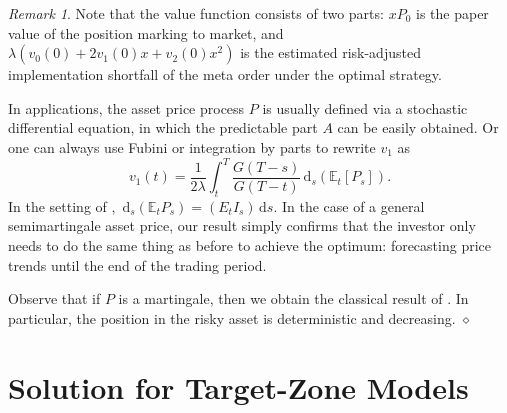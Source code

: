 \documentclass[11pt]{article}
\theoremstyle{definition}
\theoremstyle{remark}
\newtheorem{rem}[thm]{Remark}
\newcommand{\E}{\mathbb{E}} %
\newcommand{\close}{\hspace*{\fill}$\diamond$}
\newcommand{\de}{\,\mathrm{d}}
\begin{document}
\begin{rem}
Note that the value function consists of two parts: $xP_0$ is the paper value of the position marking to market, and $\lambda(v_0(0)+2v_1(0)x+v_2(0)x^2)$ is the estimated risk-adjusted implementation shortfall of the meta order under the optimal strategy.

In applications, the asset price process $P$ is usually defined via a stochastic differential equation, in which the predictable part $A$ can be easily obtained. Or one can always use Fubini or integration by parts to rewrite $v_1$ as $$v_1(t)= \frac{1}{2\lambda}\int_t^T \frac{G(T-s)}{G(T-t)} \de_s\left(\E_t[P_s]\right).$$
In the setting of \cite{lehalle2017incorporating}, $\de_s(\E_t P_s) = (E_t I_s)\de s$. In the case of a general semimartingale asset price, our result simply confirms that the investor only needs to do the same thing as before to achieve the optimum: forecasting price trends until the end of the trading period. %

Observe that if $P$ is a martingale, then we obtain the classical result of \cite{almgren2001optimal}. In particular, the position in the risky asset is deterministic and decreasing.%
\close
\end{rem}



\section{Solution for Target-Zone Models}\label{s:cap}
\end{document}

